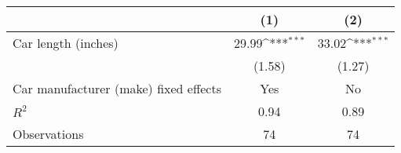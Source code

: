 {
\def\sym#1{\ifmmode^{#1}\else\(^{#1}\)\fi}
\begin{tabular}{l*{2}{c}}
\hline\hline
            &\multicolumn{1}{c}{(1)}         &\multicolumn{1}{c}{(2)}         \\
\hline
Car length (inches)&       29.99\sym{***}&       33.02\sym{***}\\
            &      (1.58)         &      (1.27)         \\
\hline
Car manufacturer (make) fixed effects&         Yes         &          No         \\
$R^{2}$     &        0.94         &        0.89         \\
Observations&          74         &          74         \\
\hline\hline
\end{tabular}
}
